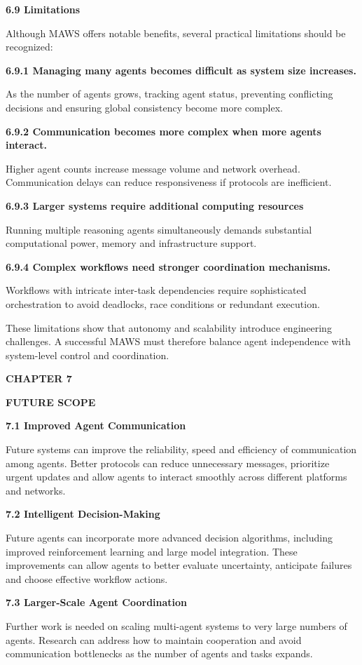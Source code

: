 \documentclass[12pt,letterpaper]{article}
\newcommand{\chaptertitle}[2]{%
  \begin{center}
    {\fontsize{15pt}{18pt}\selectfont\bfseries #1\par}%
    \vspace{2pt}%
    {\fontsize{15pt}{18pt}\selectfont\bfseries #2\par}%
  \end{center}%
  \vspace{10pt}%
}
\newcommand{\sectiontitle}[1]{%
  \vspace{6pt}%
  {\noindent\fontsize{13.2pt}{16pt}\selectfont\bfseries #1\par}%
  \vspace{2pt}%
}
\newcommand{\steptitle}[1]{%
  \vspace{4pt}%
  {\noindent\fontsize{11.3pt}{14pt}\selectfont\bfseries #1\par}%
  \vspace{1pt}%
}
\newcommand{\bodytextstyle}{\fontsize{11.3pt}{25.8pt}\selectfont}
\begin{document}
\sectiontitle{6.9 Limitations}
Although MAWS offers notable benefits, several practical limitations should be recognized:

\steptitle{6.9.1 Managing many agents becomes difficult as system size increases.}
As the number of agents grows, tracking agent status, preventing conflicting decisions and ensuring global consistency become more complex.

\steptitle{6.9.2 Communication becomes more complex when more agents interact.}
Higher agent counts increase message volume and network overhead. Communication delays can reduce responsiveness if protocols are inefficient.

\steptitle{6.9.3 Larger systems require additional computing resources}
Running multiple reasoning agents simultaneously demands substantial computational power, memory and infrastructure support.

\steptitle{6.9.4 Complex workflows need stronger coordination mechanisms.}
Workflows with intricate inter-task dependencies require sophisticated orchestration to avoid deadlocks, race conditions or redundant execution.

These limitations show that autonomy and scalability introduce engineering challenges. A successful MAWS must therefore balance agent independence with system-level control and coordination.
\newpage

\bodytextstyle
\chaptertitle{CHAPTER 7}{FUTURE SCOPE}

\sectiontitle{7.1 Improved Agent Communication}
Future systems can improve the reliability, speed and efficiency of communication among agents. Better protocols can reduce unnecessary messages, prioritize urgent updates and allow agents to interact smoothly across different platforms and networks.

\sectiontitle{7.2 Intelligent Decision-Making}
Future agents can incorporate more advanced decision algorithms, including improved reinforcement learning and large model integration. These improvements can allow agents to better evaluate uncertainty, anticipate failures and choose effective workflow actions.

\sectiontitle{7.3 Larger-Scale Agent Coordination}
Further work is needed on scaling multi-agent systems to very large numbers of agents. Research can address how to maintain cooperation and avoid communication bottlenecks as the number of agents and tasks expands.
\end{document}
